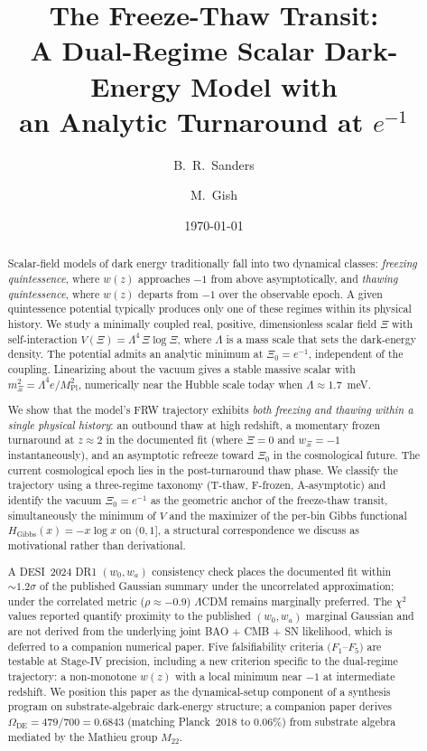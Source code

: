 \documentclass[11pt,reqno]{amsart}
\title[The Freeze-Thaw Transit]{The Freeze-Thaw Transit:\\
A Dual-Regime Scalar Dark-Energy Model with\\
an Analytic Turnaround at $e^{-1}$}
\author{B.~R.~Sanders}
\author{M.~Gish}
\date{\today}
\theoremstyle{plain}
\theoremstyle{definition}
\theoremstyle{remark}
\newcommand{\Pl}{\mathrm{Pl}}
\newcommand{\Gibbs}{\mathrm{Gibbs}}
\newcommand{\DE}{\mathrm{DE}}
\begin{document}
\begin{abstract}
Scalar-field models of dark energy traditionally fall into two
dynamical classes: \emph{freezing quintessence}, where $w(z)$
approaches $-1$ from above asymptotically, and \emph{thawing
quintessence}, where $w(z)$ departs from $-1$ over the observable
epoch. A given quintessence potential typically produces only one of
these regimes within its physical history. We study a minimally
coupled real, positive, dimensionless scalar field $\Xi$ with
self-interaction $V(\Xi) = \Lambda^{4}\,\Xi\log\Xi$, where $\Lambda$
is a mass scale that sets the dark-energy density. The potential
admits an analytic minimum at $\Xi_{0} = e^{-1}$, independent of the
coupling. Linearizing about the vacuum gives a stable massive scalar
with $m_\Xi^{2} = \Lambda^{4} e / M_\Pl^{2}$, numerically near the
Hubble scale today when $\Lambda \approx 1.7$~meV.

We show that the model's FRW trajectory exhibits \emph{both freezing
and thawing within a single physical history}: an outbound thaw at
high redshift, a momentary frozen turnaround at $z \approx 2$ in the
documented fit (where $\dot\Xi = 0$ and $w_\Xi = -1$ instantaneously),
and an asymptotic refreeze toward $\Xi_{0}$ in the cosmological future.
The current cosmological epoch lies in the post-turnaround thaw phase.
We classify the trajectory using a three-regime taxonomy (T-thaw,
F-frozen, A-asymptotic) and identify the vacuum $\Xi_{0} = e^{-1}$ as
the geometric anchor of the freeze-thaw transit, simultaneously the
minimum of $V$ and the maximizer of the per-bin Gibbs functional
$H_\Gibbs(x) = -x\log x$ on $(0, 1]$, a structural correspondence we
discuss as motivational rather than derivational.

A DESI~2024 DR1 $(w_0, w_a)$ consistency check places the documented
fit within $\sim 1.2\sigma$ of the published Gaussian summary under
the uncorrelated approximation; under the correlated metric
($\rho \approx -0.9$) $\Lambda$CDM remains marginally preferred. The
$\chi^{2}$ values reported quantify proximity to the published
$(w_0, w_a)$ marginal Gaussian and are not derived from the
underlying joint BAO + CMB + SN likelihood, which is deferred to a
companion numerical paper. Five falsifiability criteria $(F_1$--$F_5)$
are testable at Stage-IV precision, including a new criterion specific
to the dual-regime trajectory: a non-monotone $w(z)$ with a local
minimum near $-1$ at intermediate redshift. We position this paper as
the dynamical-setup component of a synthesis program on
substrate-algebraic dark-energy structure; a companion paper
\cite{SandersGish2026M22} derives $\Omega_\DE = 479/700 = 0.6843$
(matching Planck~2018 to $0.06\%$) from substrate algebra mediated by
the Mathieu group $M_{22}$.
\end{abstract}
\end{document}
